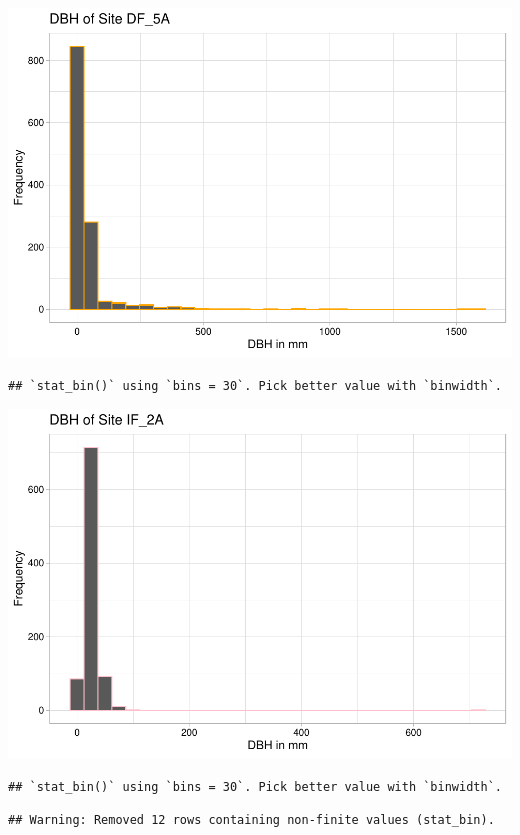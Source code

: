 \documentclass[
  12pt,
]{article}
\begin{document}
\includegraphics{GoldenGriffithsKnierMalinowski_ENV872_Project_files/figure-latex/DBH graphs-3.pdf}

\begin{verbatim}
## `stat_bin()` using `bins = 30`. Pick better value with `binwidth`.
\end{verbatim}

\includegraphics{GoldenGriffithsKnierMalinowski_ENV872_Project_files/figure-latex/DBH graphs-4.pdf}

\begin{verbatim}
## `stat_bin()` using `bins = 30`. Pick better value with `binwidth`.
\end{verbatim}

\begin{verbatim}
## Warning: Removed 12 rows containing non-finite values (stat_bin).
\end{verbatim}
\end{document}
